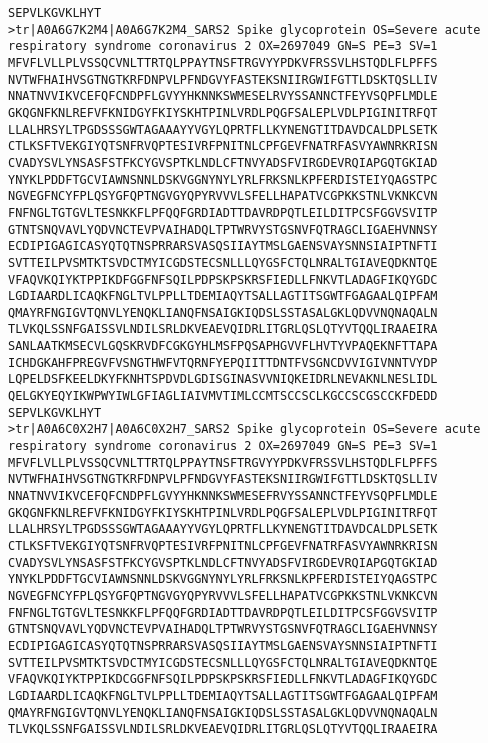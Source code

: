 \documentclass[en,black,12pt,normal]{elegantnote}
\begin{document}
\begin{lstlisting}
SEPVLKGVKLHYT
>tr|A0A6G7K2M4|A0A6G7K2M4_SARS2 Spike glycoprotein OS=Severe acute respiratory syndrome coronavirus 2 OX=2697049 GN=S PE=3 SV=1
MFVFLVLLPLVSSQCVNLTTRTQLPPAYTNSFTRGVYYPDKVFRSSVLHSTQDLFLPFFS
NVTWFHAIHVSGTNGTKRFDNPVLPFNDGVYFASTEKSNIIRGWIFGTTLDSKTQSLLIV
NNATNVVIKVCEFQFCNDPFLGVYYHKNNKSWMESELRVYSSANNCTFEYVSQPFLMDLE
GKQGNFKNLREFVFKNIDGYFKIYSKHTPINLVRDLPQGFSALEPLVDLPIGINITRFQT
LLALHRSYLTPGDSSSGWTAGAAAYYVGYLQPRTFLLKYNENGTITDAVDCALDPLSETK
CTLKSFTVEKGIYQTSNFRVQPTESIVRFPNITNLCPFGEVFNATRFASVYAWNRKRISN
CVADYSVLYNSASFSTFKCYGVSPTKLNDLCFTNVYADSFVIRGDEVRQIAPGQTGKIAD
YNYKLPDDFTGCVIAWNSNNLDSKVGGNYNYLYRLFRKSNLKPFERDISTEIYQAGSTPC
NGVEGFNCYFPLQSYGFQPTNGVGYQPYRVVVLSFELLHAPATVCGPKKSTNLVKNKCVN
FNFNGLTGTGVLTESNKKFLPFQQFGRDIADTTDAVRDPQTLEILDITPCSFGGVSVITP
GTNTSNQVAVLYQDVNCTEVPVAIHADQLTPTWRVYSTGSNVFQTRAGCLIGAEHVNNSY
ECDIPIGAGICASYQTQTNSPRRARSVASQSIIAYTMSLGAENSVAYSNNSIAIPTNFTI
SVTTEILPVSMTKTSVDCTMYICGDSTECSNLLLQYGSFCTQLNRALTGIAVEQDKNTQE
VFAQVKQIYKTPPIKDFGGFNFSQILPDPSKPSKRSFIEDLLFNKVTLADAGFIKQYGDC
LGDIAARDLICAQKFNGLTVLPPLLTDEMIAQYTSALLAGTITSGWTFGAGAALQIPFAM
QMAYRFNGIGVTQNVLYENQKLIANQFNSAIGKIQDSLSSTASALGKLQDVVNQNAQALN
TLVKQLSSNFGAISSVLNDILSRLDKVEAEVQIDRLITGRLQSLQTYVTQQLIRAAEIRA
SANLAATKMSECVLGQSKRVDFCGKGYHLMSFPQSAPHGVVFLHVTYVPAQEKNFTTAPA
ICHDGKAHFPREGVFVSNGTHWFVTQRNFYEPQIITTDNTFVSGNCDVVIGIVNNTVYDP
LQPELDSFKEELDKYFKNHTSPDVDLGDISGINASVVNIQKEIDRLNEVAKNLNESLIDL
QELGKYEQYIKWPWYIWLGFIAGLIAIVMVTIMLCCMTSCCSCLKGCCSCGSCCKFDEDD
SEPVLKGVKLHYT
>tr|A0A6C0X2H7|A0A6C0X2H7_SARS2 Spike glycoprotein OS=Severe acute respiratory syndrome coronavirus 2 OX=2697049 GN=S PE=3 SV=1
MFVFLVLLPLVSSQCVNLTTRTQLPPAYTNSFTRGVYYPDKVFRSSVLHSTQDLFLPFFS
NVTWFHAIHVSGTNGTKRFDNPVLPFNDGVYFASTEKSNIIRGWIFGTTLDSKTQSLLIV
NNATNVVIKVCEFQFCNDPFLGVYYHKNNKSWMESEFRVYSSANNCTFEYVSQPFLMDLE
GKQGNFKNLREFVFKNIDGYFKIYSKHTPINLVRDLPQGFSALEPLVDLPIGINITRFQT
LLALHRSYLTPGDSSSGWTAGAAAYYVGYLQPRTFLLKYNENGTITDAVDCALDPLSETK
CTLKSFTVEKGIYQTSNFRVQPTESIVRFPNITNLCPFGEVFNATRFASVYAWNRKRISN
CVADYSVLYNSASFSTFKCYGVSPTKLNDLCFTNVYADSFVIRGDEVRQIAPGQTGKIAD
YNYKLPDDFTGCVIAWNSNNLDSKVGGNYNYLYRLFRKSNLKPFERDISTEIYQAGSTPC
NGVEGFNCYFPLQSYGFQPTNGVGYQPYRVVVLSFELLHAPATVCGPKKSTNLVKNKCVN
FNFNGLTGTGVLTESNKKFLPFQQFGRDIADTTDAVRDPQTLEILDITPCSFGGVSVITP
GTNTSNQVAVLYQDVNCTEVPVAIHADQLTPTWRVYSTGSNVFQTRAGCLIGAEHVNNSY
ECDIPIGAGICASYQTQTNSPRRARSVASQSIIAYTMSLGAENSVAYSNNSIAIPTNFTI
SVTTEILPVSMTKTSVDCTMYICGDSTECSNLLLQYGSFCTQLNRALTGIAVEQDKNTQE
VFAQVKQIYKTPPIKDCGGFNFSQILPDPSKPSKRSFIEDLLFNKVTLADAGFIKQYGDC
LGDIAARDLICAQKFNGLTVLPPLLTDEMIAQYTSALLAGTITSGWTFGAGAALQIPFAM
QMAYRFNGIGVTQNVLYENQKLIANQFNSAIGKIQDSLSSTASALGKLQDVVNQNAQALN
TLVKQLSSNFGAISSVLNDILSRLDKVEAEVQIDRLITGRLQSLQTYVTQQLIRAAEIRA

\end{lstlisting}
\end{document}
